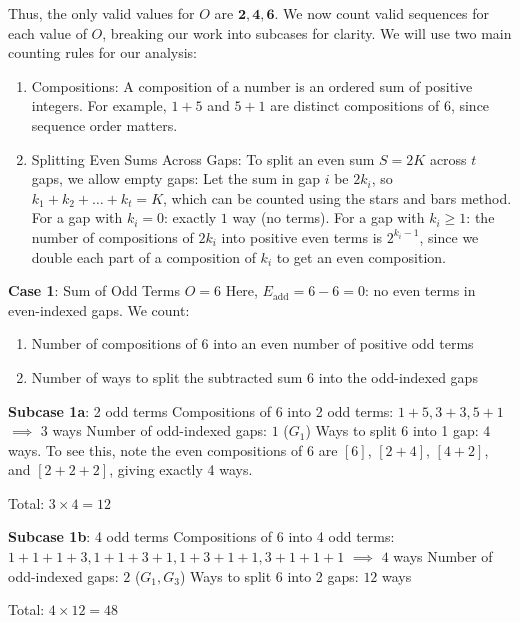 \begin{enumerate}
Thus, the only valid values for $O$ are $\boldsymbol{2, 4, 6}$. We now count valid sequences for each value of $O$, breaking our work into subcases for clarity.
We will use two main counting rules for our analysis:


 
            \begin{enumerate}
        \item Compositions: A composition of a number is an ordered sum of positive integers. For example, $1+5$ and $5+1$ are distinct compositions of $6$, since sequence order matters.
        \item Splitting Even Sums Across Gaps: To split an even sum $S = 2K$ across $t$ gaps, we allow empty gaps: Let the sum in gap $i$ be $2k_i$, so $k_1 + k_2 + \dots + k_t = K$, which can be counted using the stars and bars method. For a gap with $k_i = 0$: exactly $1$ way (no terms). For a gap with $k_i \geq 1$: the number of compositions of $2k_i$ into positive even terms is $2^{k_i - 1}$, since we double each part of a composition of $k_i$ to get an even composition.
            \end{enumerate}
            
\textbf{Case 1}: Sum of Odd Terms $O = 6$
Here, $E_{\text{add}} = 6 - 6 = 0$: no even terms in even-indexed gaps. We count:


 
            \begin{enumerate}
        \item Number of compositions of $6$ into an even number of positive odd terms
        \item Number of ways to split the subtracted sum $6$ into the odd-indexed gaps
            \end{enumerate}
            
\textbf{Subcase 1a}: 2 odd terms
Compositions of $6$ into 2 odd terms: $1+5, 3+3, 5+1$ $\implies$ $3$ ways
Number of odd-indexed gaps: $1$ ($G_1$)
Ways to split $6$ into 1 gap: $4$ ways. To see this, note the even compositions of 6 are $[6]$, $[2+4]$, $[4+2]$, and $[2+2+2]$, giving exactly 4 ways.


 Total: $3 \times 4 = 12$

 
\textbf{Subcase 1b}: 4 odd terms
Compositions of $6$ into 4 odd terms: $1+1+1+3, 1+1+3+1, 1+3+1+1, 3+1+1+1$ $\implies$ $4$ ways
Number of odd-indexed gaps: $2$ ($G_1, G_3$)
Ways to split $6$ into 2 gaps: $12$ ways


 Total: $4 \times 12 = 48$


\end{enumerate}
